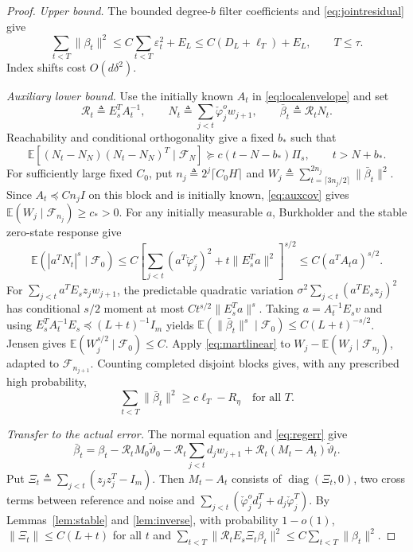 \documentclass[11pt,reqno]{amsart}
\numberwithin{equation}{section}
\theoremstyle{definition}
\theoremstyle{remark}
\newcommand{\E}{\mathbb E}
\newcommand{\F}{\mathcal F}
\newcommand{\phc}{\check{\varphi}}
\newcommand{\etac}{\widetilde{\vartheta}}
\newcommand{\diag}{\operatorname{diag}}
\begin{document}
\begin{proof}
\emph{Upper bound.}
The bounded degree-$b$ filter coefficients and \eqref{eq:jointresidual} give
\begin{equation}\label{eq:directstrongupper}
 \sum_{t<T}\|\beta_t\|^2
 \le C\sum_{t<T}\varepsilon_t^2+E_L
 \le C(D_L+\ell_T)+E_L,\qquad T\le\tau.
\end{equation}
Index shifts cost $O(d\delta^2)$.

\emph{Auxiliary lower bound.}
Use the initially known $A_t$ in \eqref{eq:localenvelope} and set
\begin{equation*}
 \mathcal R_t\triangleq E_s^T A_t^{-1},\qquad
 N_t\triangleq\sum_{j<t}\phc_j^o w_{j+1},\qquad \bar\beta_t\triangleq\mathcal R_tN_t.
\end{equation*}
Reachability and conditional orthogonality give a fixed $b_*$ such that
\begin{equation}\label{eq:auxcov}
 \E[(N_t-N_N)(N_t-N_N)^T\mid\F_N]
 \succeq c(t-N-b_*)\Pi_s,\qquad t>N+b_*.
\end{equation}
For sufficiently large fixed $C_0$, put $n_j\triangleq2^j\lceil C_0H\rceil$ and
$W_j\triangleq\sum_{t=\lceil3n_j/2\rceil}^{2n_j}\|\bar\beta_t\|^2$.
Since $A_t\preceq Cn_jI$ on this block and is initially known,
\eqref{eq:auxcov} gives $\E(W_j\mid\F_{n_j})\ge c_*>0$.
For any initially measurable $a$, Burkholder and the stable zero-state response give
\begin{equation*}
 \E(|a^T N_t|^s\mid\F_0)
 \le C\left[\sum_{j<t}(a^T\phc_j^r)^2+t\|E_s^T a\|^2\right]^{s/2}
 \le C(a^T A_ta)^{s/2}.
\end{equation*}
For $\sum_{j<t}a^TE_sz_jw_{j+1}$, the predictable quadratic variation $\sigma^2\sum_{j<t}(a^TE_sz_j)^2$ has conditional $s/2$ moment at most $Ct^{s/2}\|E_s^T a\|^s$.
Taking $a=A_t^{-1}E_sv$ and using
$E_s^T A_t^{-1}E_s\preceq(L+t)^{-1}I_m$ yields
$\E(\|\bar\beta_t\|^s\mid\F_0)\le C(L+t)^{-s/2}$.
Jensen gives $\E(W_j^{s/2}\mid\F_0)\le C$.
Apply \eqref{eq:martlinear} to
$W_j-\E(W_j\mid\F_{n_j})$, adapted to $\F_{n_{j+1}}$.
Counting completed disjoint blocks gives, with any prescribed high probability,
\begin{equation}\label{eq:auxlog}
 \sum_{t<T}\|\bar\beta_t\|^2\ge c\ell_T-R_\eta
 \quad\text{for all }T.
\end{equation}

\emph{Transfer to the actual error.}
The normal equation and \eqref{eq:regerr} give
\begin{equation}\label{eq:compare}
 \bar\beta_t=\beta_t-\mathcal R_tM_0\etac_0-\mathcal R_t\sum_{j<t}d_jw_{j+1}+\mathcal R_t(M_t-A_t)\etac_t.
\end{equation}
Put $\Xi_t\triangleq\sum_{j<t}(z_jz_j^T-I_m)$. Then $M_t-A_t$ consists of $\diag(\Xi_t,0)$, two cross terms between reference and noise and $\sum_{j<t}(\phc_j^od_j^T+d_j\phc_j^T)$.
 By
Lemmas~\ref{lem:stable} and \ref{lem:inverse}, with probability $1-o(1)$,
$\|\Xi_t\|\le C(L+t)$ for all $t$ and
$\sum_{t<T}\|\mathcal R_tE_s\Xi_t\beta_t\|^2\le
C\sum_{t<T}\|\beta_t\|^2$.


\end{proof}
\end{document}
